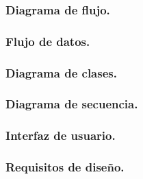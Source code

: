 \documentclass[12pt, a4paper, titlepage]{article}
\begin{document}
			\subsubsection{Diagrama de flujo.}

			\subsubsection{Flujo de datos.}
			\subsubsection{Diagrama de clases.}
			\subsubsection{Diagrama de secuencia.}
			\subsubsection{Interfaz de usuario.}
			\subsubsection{Requisitos de diseño.}
			
\end{document}
